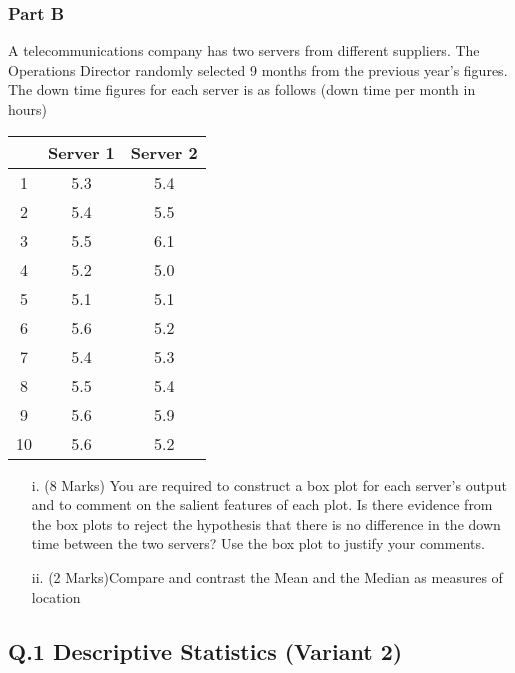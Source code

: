 \documentclass[a4paper,12pt]{article}
\begin{document}
\subsubsection*{Part B} %
A telecommunications company has two servers from different suppliers. The Operations Director randomly selected 9 months from the previous year's figures.  The down time figures for each server is as follows (down time per month in hours)

\begin{center}
\begin{tabular}{|c|c|c|}
  \hline
	&Server 1&	Server 2\\\hline
1	&5.3	&5.4\\
2	&5.4	&5.5\\
3	&5.5	&6.1\\
4	&5.2	&5.0\\
5	&5.1	&5.1\\
6	&5.6	&5.2\\
7	&5.4	&5.3\\
8	&5.5	&5.4\\
9	&5.6	&5.9\\
10  &5.6    &5.2\\
  \hline
\end{tabular}
\end{center}

\begin{itemize}
\item[i.](8 Marks) You are required to construct a box plot for each server's output and to comment on the salient features of each plot.  Is there evidence from the box plots to reject the hypothesis that there is no difference in the down time between the two servers?  Use the box plot to justify your comments. 							 \item[ii.](2 Marks)Compare and contrast the Mean and the Median as measures of location
\end{itemize}


\newpage
\subsection*{Q.1 Descriptive Statistics (Variant 2)}
\end{document}

